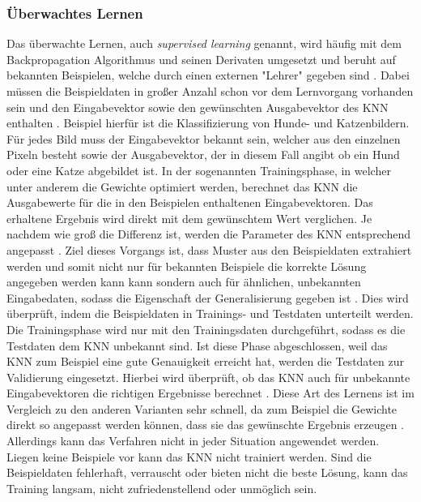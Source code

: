 \subsubsection{Überwachtes Lernen}
\label{subsubsec:supervised_learning}
Das überwachte Lernen, auch \emph{supervised learning} genannt, wird häufig mit dem Backpropagation Algorithmus und seinen Derivaten umgesetzt und beruht auf bekannten Beispielen, welche durch einen externen "Lehrer" gegeben sind \cite{zell2003simulation}. Dabei müssen die Beispieldaten in großer Anzahl schon vor dem Lernvorgang vorhanden sein und den Eingabevektor sowie den gewünschten Ausgabevektor des \ac{KNN} enthalten \cite{zell2003simulation}. Beispiel hierfür ist die Klassifizierung von Hunde- und Katzenbildern. Für jedes Bild muss der Eingabevektor bekannt sein, welcher aus den einzelnen Pixeln besteht sowie der Ausgabevektor, der in diesem Fall angibt ob ein Hund oder eine Katze abgebildet ist. In der sogenannten Trainingsphase, in welcher unter anderem die Gewichte optimiert werden, berechnet das \ac{KNN} die Ausgabewerte für die in den Beispielen enthaltenen Eingabevektoren. Das erhaltene Ergebnis wird direkt mit dem gewünschtem Wert verglichen. Je nachdem wie groß die Differenz ist, werden die Parameter des \ac{KNN} entsprechend angepasst \cite{kriesel2008kleiner}. Ziel dieses Vorgangs ist, dass Muster aus den Beispieldaten extrahiert werden und somit nicht nur für bekannten Beispiele die korrekte Lösung angegeben werden kann kann sondern auch für ähnlichen, unbekannten Eingabedaten, sodass die Eigenschaft der Generalisierung gegeben ist \cite{zell2003simulation}. Dies wird überprüft, indem die Beispieldaten in Trainings- und Testdaten unterteilt werden. Die Trainingsphase wird nur mit den Trainingsdaten durchgeführt, sodass es die Testdaten dem \ac{KNN} unbekannt sind. Ist diese Phase abgeschlossen, weil das \ac{KNN} zum Beispiel eine gute Genauigkeit erreicht hat, werden die Testdaten zur Validierung eingesetzt. Hierbei wird überprüft, ob das \ac{KNN} auch für unbekannte Eingabevektoren die richtigen Ergebnisse berechnet \cite{kriesel2008kleiner}. Diese Art des Lernens ist im Vergleich zu den anderen Varianten sehr schnell, da zum Beispiel die Gewichte direkt so angepasst werden können, dass sie das gewünschte Ergebnis erzeugen \cite{zell2003simulation}. Allerdings kann das Verfahren nicht in jeder Situation angewendet werden. Liegen keine Beispiele vor kann das \ac{KNN} nicht trainiert werden. Sind die Beispieldaten fehlerhaft, verrauscht oder bieten nicht die beste Lösung, kann das Training langsam, nicht zufriedenstellend oder unmöglich sein.

